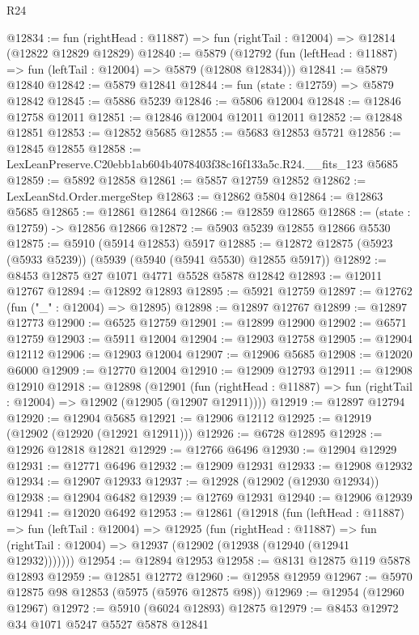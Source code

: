 \begin{lexlean}{R24}
\begin{coremodule}
@12834 := fun (rightHead : @11887) => fun (rightTail : @12004) => @12814 (@12822 @12829 @12829)
@12840 := @5879
    (@12792 (fun (leftHead : @11887) => fun (leftTail : @12004) => @5879 (@12808 @12834)))
@12841 := @5879 @12840
@12842 := @5879 @12841
@12844 := fun (state : @12759) => @5879 @12842
@12845 := @5886 @5239
@12846 := @5806 @12004
@12848 := @12846 @12758 @12011
@12851 := @12846 @12004 @12011 @12011
@12852 := @12848 @12851
@12853 := @12852 @5685
@12855 := @5683 @12853 @5721
@12856 := @12845 @12855
@12858 := LexLeanPreserve.C20ebb1ab604b4078403f38c16f133a5c.R24.__fits_123 @5685
@12859 := @5892 @12858
@12861 := @5857 @12759 @12852
@12862 := LexLeanStd.Order.mergeStep
@12863 := @12862 @5804
@12864 := @12863 @5685
@12865 := @12861 @12864
@12866 := @12859 @12865
@12868 := (state : @12759) -> @12856 @12866
@12872 := @5903 @5239 @12855 @12866 @5530
@12875 := @5910 (@5914 @12853) @5917
@12885 := @12872 @12875 (@5923 (@5933 @5239)) (@5939 (@5940 (@5941 @5530) @12855 @5917))
@12892 := @8453 @12875 @27 @1071 @4771 @5528 @5878 @12842
@12893 := @12011 @12767
@12894 := @12892 @12893
@12895 := @5921 @12759
@12897 := @12762 (fun ("_" : @12004) => @12895)
@12898 := @12897 @12767
@12899 := @12897 @12773
@12900 := @6525 @12759
@12901 := @12899 @12900
@12902 := @6571 @12759
@12903 := @5911 @12004
@12904 := @12903 @12758
@12905 := @12904 @12112
@12906 := @12903 @12004
@12907 := @12906 @5685
@12908 := @12020 @6000
@12909 := @12770 @12004
@12910 := @12909 @12793
@12911 := @12908 @12910
@12918 := @12898
    (@12901
      (fun (rightHead : @11887) => fun (rightTail : @12004) => @12902 (@12905 (@12907 @12911))))
@12919 := @12897 @12794
@12920 := @12904 @5685
@12921 := @12906 @12112
@12925 := @12919 (@12902 (@12920 (@12921 @12911)))
@12926 := @6728 @12895
@12928 := @12926 @12818 @12821
@12929 := @12766 @6496
@12930 := @12904 @12929
@12931 := @12771 @6496
@12932 := @12909 @12931
@12933 := @12908 @12932
@12934 := @12907 @12933
@12937 := @12928 (@12902 (@12930 @12934))
@12938 := @12904 @6482
@12939 := @12769 @12931
@12940 := @12906 @12939
@12941 := @12020 @6492
@12953 := @12861
    (@12918
      (fun (leftHead : @11887) =>
      fun (leftTail : @12004) =>
      @12925
        (fun (rightHead : @11887) =>
        fun (rightTail : @12004) => @12937 (@12902 (@12938 (@12940 (@12941 @12932)))))))
@12954 := @12894 @12953
@12958 := @8131 @12875 @119 @5878 @12893
@12959 := @12851 @12772
@12960 := @12958 @12959
@12967 := @5970 @12875 @98 @12853 (@5975 (@5976 @12875 @98))
@12969 := @12954 (@12960 @12967)
@12972 := @5910 (@6024 @12893) @12875
@12979 := @8453 @12972 @34 @1071 @5247 @5527 @5878 @12841

\end{coremodule}
\end{lexlean}
